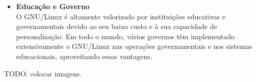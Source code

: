 \begin{itemize}
    \item \textbf{Educação e Governo}\\
    O GNU/Linux é altamente valorizado por instituições educativas e governamentais devido ao seu baixo custo e à sua capacidade de personalização. Em todo o mundo, vários governos têm implementado extensivamente o GNU/Linux nas operações governamentais e nos sistemas educacionais, aproveitando essas vantagens.

\end{itemize}

\par \vspace{6pt}

TODO: colocar imagens.
